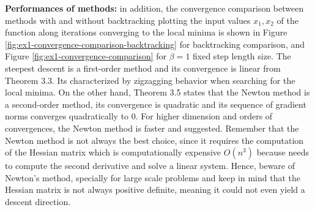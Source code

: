 \documentclass[unicode,11pt,a4paper,oneside,numbers=endperiod,openany]{scrartcl}
\begin{document}
\textbf{Performances of methods:}
in addition, the convergence comparison between methods with and without backtracking
plotting the input values $x_1, x_2$ of the function along iterations converging to the local minima 
is shown in Figure \ref{fig:ex1-convergence-comparison-backtracking} for backtracking comparison, 
and Figure \ref{fig:ex1-convergence-comparison} for $\beta = 1$ fixed step length size.
The steepest descent is a first-order method and its convergence is linear from Theorem 3.3.
Its characterized by zigzagging behavior when searching for the local minima.
On the other hand, Theorem 3.5 states that the Newton method is a second-order method, 
its convergence is quadratic and its sequence of gradient norms converges quadratically to 0.
For higher dimension and orders of convergences, the Newton method is faster and suggested.
Remember that the Newton method is not always the best choice, 
since it requires the computation of the Hessian matrix which is computationally expensive $O(n^3)$ 
because needs to compute the second derivative and solve a linear system. 
Hence, beware of Newton's method, specially for large scale problems 
and keep in mind that the Hessian matrix is not always positive definite, 
meaning it could not even yield a descent direction. 
\clearpage






\end{document}
